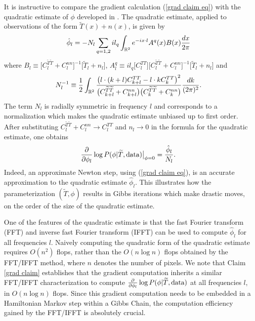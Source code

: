 \documentclass[iop,revtex4,apj,onecolumn]{emulateapj}
\begin{document}
It is instructive to compare the gradient calculation (\ref{grad claim eq}) with the quadratic estimate of $\phi$ 
 developed in \cite{hu2001mapping,hu2002mass}. The quadratic estimate, applied to observations of the form $ \widetilde T(x) + n(x)$, is given by 
 \begin{equation}
\label{quad estimate}
 \hat \phi_l = - N_l  \sum_{q=1,2} i  l_q \int_{\Bbb R^2} e^{-i x\cdot l} A^q(x)B(x) \frac{dx}{2\pi}  
\end{equation}
where  $B_l  \equiv \bigl[C_l^{\widetilde T\widetilde T}+ C_l^{nn}\bigr]^{-1}\bigl[\widetilde T_l + n_l \bigr]$, $A^q_l\equiv il_q\bigl[ C_l^{TT}\bigr]\bigl[C_l^{\widetilde T\widetilde T} + C_l^{nn}\bigr]^{-1} \bigl[\widetilde T_l + n_l \bigr]$ and 
\[
N_l^{-1} \equiv \frac{1}{2} \int_{\Bbb R^2}  \frac{\bigl(l\cdot(k+l) C^{TT}_{k+l} - l\cdot k C^{TT}_{k} \bigr)^2}{\bigl(C^{\widetilde T\widetilde T}_{k+l}+ C_{k+l}^{nn} \bigr)\bigl(  C^{\widetilde T\widetilde T}_{k}+ C_{k}^{nn} \bigr)}\frac{dk}{(2\pi)^2}.
\] 
The term $N_l$ is radially symmetric in frequency $l$ and corresponds to a normalization which makes the quadratic estimate unbiased up to first order. After substituting $ C_l^{\widetilde T\widetilde T} + C_l^{nn}\rightarrow C_l^{TT}$ and $n_l \rightarrow 0$ in the formula for the quadratic estimate, one obtains 
\[
 \frac{\partial}{\partial \phi_l}\log P(\phi | \widetilde T,  \text{\rm data})\bigr|_{\phi = 0} = \frac{\hat \phi_l}{N_l}.
\]
Indeed, an approximate Newton step, using (\ref{grad claim eq}), is an accurate approximation to the quadratic estimate $\hat \phi_l$.  This illustrates how the parameterization $(\widetilde T, \phi)$ results in Gibbs iterations which make drastic moves, on the order of the size of the quadratic estimate. 

One of the features of the quadratic estimate is that the fast Fourier transform (FFT) and inverse fast Fourier transform (IFFT) can be used to compute $\hat \phi_l$ for all frequencies $l$. Naively computing the quadratic form of the quadratic estimate requires $O(n^2)$ flops, rather than the $O(n\log n)$ flops obtained by the FFT/IFFT method, where $n$ denotes the number of pixels. We note that Claim \ref{grad claim} establishes that the gradient computation inherits a similar FFT/IFFT characterization to compute $ \frac{\partial}{\partial \phi_l}\log P(\phi | \widetilde T,  \text{\rm data})$ at all frequencies $l$, in $O(n\log n)$ flops. Since this gradient computation needs to be embedded in a  Hamiltonian Markov step within a Gibbs Chain, the computation efficiency gained by the FFT/IFFT is absolutely crucial.  
\end{document}

